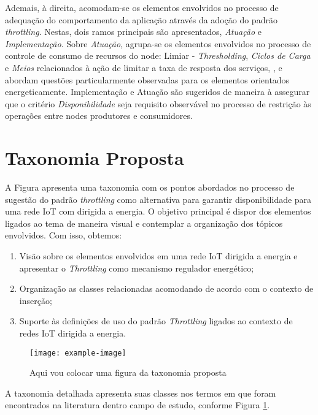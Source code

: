 Ademais, à direita, acomodam-se os elementos envolvidos no processo de adequação do comportamento da aplicação através da adoção do padrão \textit{throttling}. Nestas, dois ramos principais são apresentados, \textit{Atuação} e \textit{Implementação}. Sobre \textit{Atuação}, agrupa-se os elementos envolvidos no processo de controle de consumo de recursos do node: Limiar - \textit{Thresholding}, \textit{Ciclos de Carga} e \textit{Meios} relacionados à ação de limitar a taxa de resposta dos serviços,  \cite{khairnar_discrete-rate_2015}, \cite{khan_energy_2015} e \cite{sudevalayam_energy_2011} abordam questões particularmente observadas para os elementos orientados energeticamente. Implementação e Atuação são sugeridos de maneira à assegurar que o critério \textit{Disponibilidade} seja requisito observável no processo de restrição às operações entre nodes produtores e consumidores.


\section{Taxonomia Proposta}
A Figura apresenta uma taxonomia com os pontos abordados no processo de sugestão do padrão \textit{throttling} como alternativa para garantir disponibilidade para uma rede IoT com dirigida a energia. O objetivo principal é dispor dos elementos ligados ao tema de maneira visual e contemplar a organização dos tópicos envolvidos. Com isso, obtemos:

\begin{enumerate}
    \item Visão sobre os elementos envolvidos em uma rede \acs{IoT} dirigida a energia e apresentar o \textit{Throttling} como mecanismo regulador energético;
    \item Organização as classes relacionadas acomodando de acordo com o contexto de inserção;
    \item Suporte às definições de uso do padrão \textit{Throttling} ligados ao contexto de redes \acs{IoT} dirigida a energia. 
\end{enumerate}

\begin{figure}[h]
\noindent\texttt{[image: example-image]} 
\caption{Aqui vou colocar uma figura da taxonomia proposta}
\label{fig:taxonomia_detalhada}
\centering
\end{figure}

A taxonomia detalhada apresenta suas classes nos termos em que foram encontrados na literatura dentro campo de estudo, conforme Figura \ref{fig:taxonomia_detalhada}.

